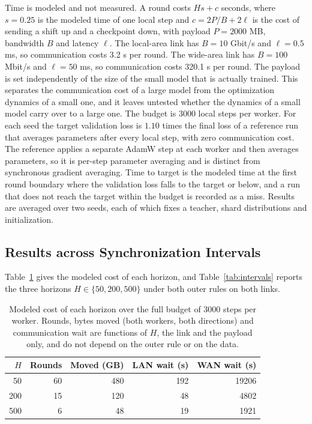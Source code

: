 \documentclass[11pt]{article}
\theoremstyle{definition}
\theoremstyle{remark}
\begin{document}
Time is modeled and not measured. A round costs $Hs+c$ seconds, where $s=0.25$ is the modeled time of one local step and $c=2P/B+2\ell$ is the cost of sending a shift up and a checkpoint down, with payload $P=2000$ MB, bandwidth $B$ and latency $\ell$. The local-area link has $B=10$ Gbit/s and $\ell=0.5$ ms, so communication costs 3.2 s per round. The wide-area link has $B=100$ Mbit/s and $\ell=50$ ms, so communication costs 320.1 s per round. The payload is set independently of the size of the small model that is actually trained. This separates the communication cost of a large model from the optimization dynamics of a small one, and it leaves untested whether the dynamics of a small model carry over to a large one. The budget is 3000 local steps per worker. For each seed the target validation loss is $1.10$ times the final loss of a reference run that averages parameters after every local step, with zero communication cost. The reference applies a separate AdamW step at each worker and then averages parameters, so it is per-step parameter averaging and is distinct from synchronous gradient averaging. Time to target is the modeled time at the first round boundary where the validation loss falls to the target or below, and a run that does not reach the target within the budget is recorded as a miss. Results are averaged over two seeds, each of which fixes a teacher, shard distributions and initialization.

\subsection{Results across Synchronization Intervals}

Table~\ref{tab:cost} gives the modeled cost of each horizon, and Table~\ref{tab:intervals} reports the three horizons $H\in\{50,200,500\}$ under both outer rules on both links.

\begin{table}[h]
\centering
\small
\begin{tabular}{rrrrr}
\toprule
$H$ & Rounds & Moved (GB) & LAN wait (s) & WAN wait (s)\\
\midrule
 50 & 60 & 480 &  192 & 19206\\
200 & 15 & 120 &   48 &  4802\\
500 &  6 &  48 &   19 &  1921\\
\bottomrule
\end{tabular}
\caption{Modeled cost of each horizon over the full budget of 3000 steps per worker. Rounds, bytes moved (both workers, both directions) and communication wait are functions of $H$, the link and the payload only, and do not depend on the outer rule or on the data.}
\label{tab:cost}
\end{table}
\end{document}
